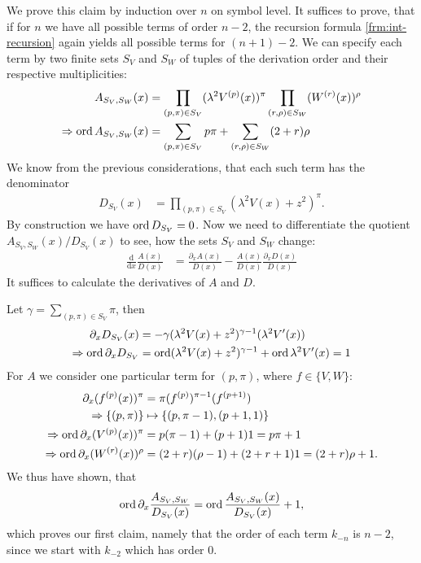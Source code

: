 \begin{Remark}
  \begin{Proof}
    We prove this claim by induction over $n$ on symbol level. It suffices to
    prove, that if for $n$ we have all possible terms of order $n-2$, the
    recursion formula \eqref{frm:int-recursion} again yields all possible terms
    for $(n+1)-2$. We can specify each term by two finite sets $S_V$ and $S_W$
    of tuples of the derivation order and their respective multiplicities:
    \begin{align*}
      A_{S_V,S_W}(x) &= \prod_{(p,\pi)\in S_V} (\lambda^2 V^{(p)}(x))^\pi
      \prod_{(r,\rho)\in S_W} (W^{(r)}(x))^\rho \\
      \Rightarrow \operatorname{ord} A_{S_V,S_W}(x) &= \sum_{(p,\pi)\in S_V} p\pi +
      \sum_{(r,\rho)\in S_W} (2+r)\rho
    \end{align*}
    We know from the previous considerations, that each such term has the
    denominator
    \begin{align*}
      D_{S_V}(x) &= \prod_{(p,\pi)\in S_V} (\lambda^2 V(x) + z^2)^\pi.
    \end{align*}
    By construction we have $\operatorname{ord} D_{S_V} = 0$. Now we need to differentiate the
    quotient $A_{S_V,S_W}(x) / D_{S_V}(x)$ to see, how the sets $S_V$ and $S_W$
    change:
    \begin{align*}
      \frac{\mathrm d}{\mathrm dx}\frac{A(x)}{D(x)} &= \frac{\partial_x
        A(x)}{D(x)} - \frac{A(x)}{D(x)} \frac{\partial_x D(x)}{D(x)}
    \end{align*}
    It suffices to calculate the derivatives of $A$ and $D$.

    Let $\gamma = \sum_{(p,\pi)\in S_V}\pi$, then
    \begin{align*}
      \partial_x D_{S_V}(x) &= -\gamma (\lambda^2 V(x) + z^2)^{\gamma - 1}
      (\lambda^2 V'(x)) \\
      \Rightarrow \operatorname{ord} \partial_x D_{S_V} &= \operatorname{ord} (\lambda^2 V(x) + z^2)^{\gamma - 1}
      + \operatorname{ord} \lambda^2 V'(x) = 1
    \end{align*}
    For $A$ we consider one particular term for $(p,\pi)$, where $f\in\{V,W\}$:
    \begin{align*}
      \partial_x (f^{(p)}(x))^\pi &= \pi (f^{(p)})^{\pi-1}
      (f^{(p+1)}) \\
      \Rightarrow \{(p,\pi)\} &\mapsto \{(p,\pi-1), (p+1,1)\} \\
      \Rightarrow \operatorname{ord} \partial_x (V^{(p)}(x))^\pi &= p(\pi-1) + (p+1)1 = p\pi +
      1 \\
      \Rightarrow \operatorname{ord} \partial_x (W^{(r)}(x))^\rho &= (2 + r)(\rho-1) +
      (2+r+1)1 = (2+r)\rho + 1.
    \end{align*}
    We thus have shown, that
    \begin{align*}
      \operatorname{ord} \partial_x\frac{A_{S_V,S_W}}{D_{S_V}(x)} = \operatorname{ord}
      \frac{A_{S_V,S_W}(x)}{D_{S_V}(x)} + 1,
    \end{align*}
    which proves our first claim, namely that the order of each term $k_{-n}$ is
    $n-2$, since we start with $k_{-2}$ which has order $0$.


\end{Proof}
\end{Remark}

